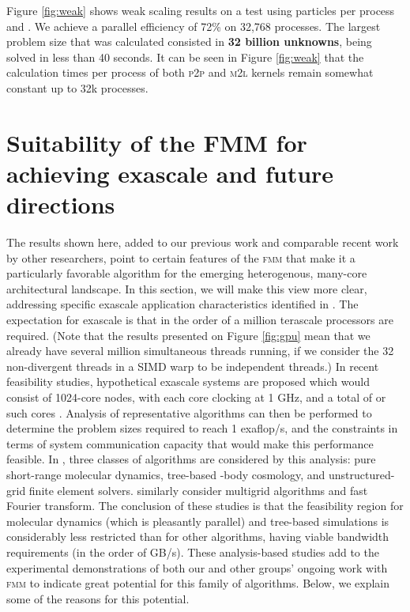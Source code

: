 \documentclass[10pt,twocolumn]{article}
\newcommand{\fmm}{\textsc{fmm}\xspace}
\newcommand{\ML}{\textsc{m}2\textsc{l}\xspace}
\newcommand{\PP}{\textsc{p}2\textsc{p}\xspace}
\newlength{\up}
\begin{document}
Figure \ref{fig:weak} shows weak scaling results on a test using  particles per process and . We achieve a parallel efficiency of 72\% on 32,768 processes. The largest problem size that was calculated consisted in \textbf{32 billion unknowns}, being solved in less than 40 seconds. It can be seen in Figure \ref{fig:weak} that the calculation times per process of both \PP and \ML kernels remain somewhat constant up to 32k processes.


\section{Suitability of the FMM for achieving exascale and future directions}\label{s:exafmm} 
 
The results shown here, added to our previous work and comparable recent work by other researchers, point to certain features of the \fmm that make it a particularly favorable algorithm for the emerging heterogenous, many-core architectural landscape.  In this section, we will make this view more clear, addressing specific exascale application characteristics identified in \cite{DarpaExascale2008}. The expectation for exascale is that in the order of a million terascale processors are required.
(Note that the results presented on Figure  \ref{fig:gpu} mean that we already have several million simultaneous threads running, if we consider the 32 non-divergent threads in a SIMD warp to be independent threads.) In recent feasibility studies, hypothetical exascale systems are proposed which would consist of 1024-core nodes, with each core clocking at 1 GHz, and a total of  or  such cores \cite[]{GahvariGropp2010,BhateleETal2011}. Analysis of representative algorithms can then be performed to determine the problem sizes required to reach 1 exaflop/s, and the constraints in terms of system communication capacity that would make this performance feasible. In  \cite{BhateleETal2011}, three classes of algorithms are considered by this analysis: pure short-range molecular dynamics, tree-based -body cosmology, and unstructured-grid finite element solvers. \cite{GahvariGropp2010} similarly consider multigrid algorithms and fast Fourier transform. The conclusion of these studies is that the feasibility region for molecular dynamics (which is pleasantly parallel) and tree-based simulations is considerably less restricted than for other algorithms, having viable bandwidth requirements (in the order of  GB/s). These analysis-based studies add to the experimental demonstrations of both our and other groups' ongoing work with \fmm to indicate great potential for this family of algorithms. Below, we explain some of the reasons for this potential.
\end{document}
